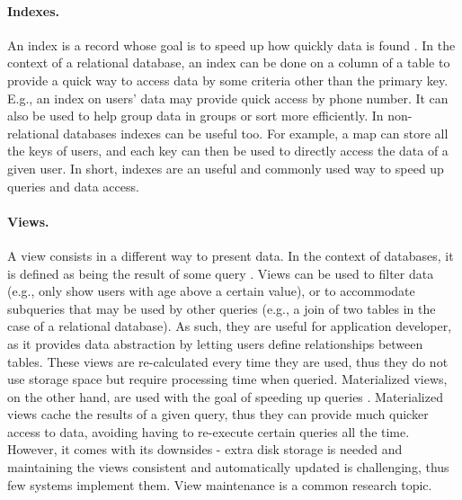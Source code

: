 \paragraph{Indexes.}
An index is a record whose goal is to speed up how quickly data is found \cite{partIndex, genIndex, mongoVScassandra}. %
In the context of a relational database, an index can be done on a column of a table to provide a quick way to access data by some criteria other than the primary key.
E.g., an index on users' data may provide quick access by phone number.
It can also be used to help group data in groups or sort more efficiently.
In non-relational databases indexes can be useful too. For example, a map can store all the keys of users, and each key can then be used to directly access the data of a given user.
In short, indexes are an useful and commonly used way to speed up queries and data access.

\paragraph{Views.}
A view consists in a different way to present data.
In the context of databases, it is defined as being the result of some query \cite{txcache}. %
Views can be used to filter data (e.g., only show users with age above a certain value), or to accommodate subqueries that may be used by other queries (e.g., a join of two tables in the case of a relational database).
As such, they are useful for application developer, as it provides data abstraction by letting users define relationships between tables.
These views are re-calculated every time they are used, thus they do not use storage space but require processing time when queried.
Materialized views, on the other hand, are used with the goal of speeding up queries \cite{noria, pequod, txcache, partView, viewSelection, incMaintenance, effMaintenance, lazyMaintenance}. %
Materialized views cache the results of a given query, thus they can provide much quicker access to data, avoiding having to re-execute certain queries all the time.
However, it comes with its downsides - extra disk storage is needed and maintaining the views consistent and automatically updated is challenging, thus few systems implement them.
View maintenance is a common research topic. 

